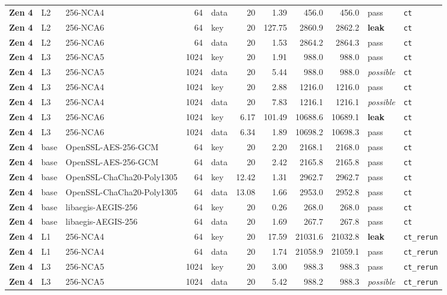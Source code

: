 {\begin{longtable}{@{}>{\bfseries}l l l r l r r r r l l@{}}
Zen 4 & L2 & 256-NCA4 & 64 & data & 20 & 1.39 & 456.0 & 456.0 & pass & \texttt{ct} \\
Zen 4 & L2 & 256-NCA6 & 64 & key & 20 & 127.75 & 2860.9 & 2862.2 & \textbf{leak} & \texttt{ct} \\
Zen 4 & L2 & 256-NCA6 & 64 & data & 20 & 1.53 & 2864.2 & 2864.3 & pass & \texttt{ct} \\
Zen 4 & L3 & 256-NCA5 & 1024 & key & 20 & 1.91 & 988.0 & 988.0 & pass & \texttt{ct} \\
Zen 4 & L3 & 256-NCA5 & 1024 & data & 20 & 5.44 & 988.0 & 988.0 & \emph{possible} & \texttt{ct} \\
Zen 4 & L3 & 256-NCA4 & 1024 & key & 20 & 2.88 & 1216.0 & 1216.0 & pass & \texttt{ct} \\
Zen 4 & L3 & 256-NCA4 & 1024 & data & 20 & 7.83 & 1216.1 & 1216.1 & \emph{possible} & \texttt{ct} \\
Zen 4 & L3 & 256-NCA6 & 1024 & key & 6.17 & 101.49 & 10688.6 & 10689.1 & \textbf{leak} & \texttt{ct} \\
Zen 4 & L3 & 256-NCA6 & 1024 & data & 6.34 & 1.89 & 10698.2 & 10698.3 & pass & \texttt{ct} \\
Zen 4 & base & OpenSSL-AES-256-GCM & 64 & key & 20 & 2.20 & 2168.1 & 2168.0 & pass & \texttt{ct} \\
Zen 4 & base & OpenSSL-AES-256-GCM & 64 & data & 20 & 2.42 & 2165.8 & 2165.8 & pass & \texttt{ct} \\
Zen 4 & base & OpenSSL-ChaCha20-Poly1305 & 64 & key & 12.42 & 1.31 & 2962.7 & 2962.7 & pass & \texttt{ct} \\
Zen 4 & base & OpenSSL-ChaCha20-Poly1305 & 64 & data & 13.08 & 1.66 & 2953.0 & 2952.8 & pass & \texttt{ct} \\
Zen 4 & base & libaegis-AEGIS-256 & 64 & key & 20 & 0.26 & 268.0 & 268.0 & pass & \texttt{ct} \\
Zen 4 & base & libaegis-AEGIS-256 & 64 & data & 20 & 1.69 & 267.7 & 267.8 & pass & \texttt{ct} \\
\midrule
Zen 4 & L1 & 256-NCA4 & 64 & key & 20 & 17.59 & 21031.6 & 21032.8 & \textbf{leak} & \texttt{ct\_rerun} \\
Zen 4 & L1 & 256-NCA4 & 64 & data & 20 & 1.74 & 21058.9 & 21059.1 & pass & \texttt{ct\_rerun} \\
Zen 4 & L3 & 256-NCA5 & 1024 & key & 20 & 3.00 & 988.3 & 988.3 & pass & \texttt{ct\_rerun} \\
Zen 4 & L3 & 256-NCA5 & 1024 & data & 20 & 5.42 & 988.2 & 988.3 & \emph{possible} & \texttt{ct\_rerun} \\

\end{longtable}}

